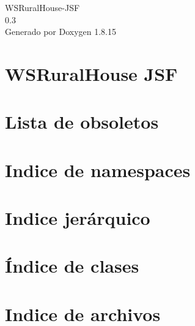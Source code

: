 \let\mypdfximage\pdfximage\def\pdfximage{\immediate\mypdfximage}\documentclass[twoside]{book}
\newcommand{\+}{\discretionary{\mbox{\scriptsize$\hookleftarrow$}}{}{}}
\newcommand{\clearemptydoublepage}{%
  \newpage{\pagestyle{empty}\cleardoublepage}%
}
\begin{document}
\hypersetup{pageanchor=false,
             bookmarksnumbered=true,
             pdfencoding=unicode
            }
\begin{titlepage}
\vspace*{7cm}
\begin{center}%
{\Large W\+S\+Rural\+House-\/\+J\+SF \\[1ex]\large 0.\+3 }\\
\vspace*{1cm}
{\large Generado por Doxygen 1.8.15}\\
\end{center}
\end{titlepage}
\clearemptydoublepage
{}
\tableofcontents
\clearemptydoublepage
{}
\hypersetup{pageanchor=true}

\chapter{W\+S\+Rural\+House J\+SF}
\label{index}\hypertarget{index}{}
\chapter{Lista de obsoletos}
\label{deprecated}

\chapter{Indice de namespaces}

\chapter{Indice jerárquico}

\chapter{Índice de clases}

\chapter{Indice de archivos}

\end{document}
